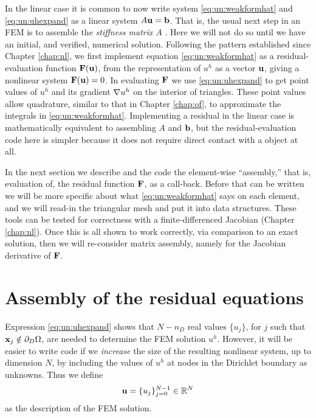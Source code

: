 In the linear case it is common to now write system \eqref{eq:un:weakformhat} and \eqref{eq:un:uhexpand} as a linear system $A \mathbf{u} = \mathbf{b}$.  That is, the usual next step in an FEM is to assemble the \emph{stiffness matrix} $A$ \citep{Elmanetal2005}.  Here we will not do so until we have an initial, and verified, numerical solution.  Following the pattern established since Chapter \ref{chap:nl}, we first implement equation \eqref{eq:un:weakformhat} as a residual-evaluation function $\mathbf{F}(\mathbf{u})$, from the representation of $u^h$ as a vector $\mathbf{u}$, giving a nonlinear system $\mathbf{F}(\mathbf{u}) = 0$.  In evaluating $\mathbf{F}$ we use \eqref{eq:un:uhexpand} to get point values of $u^h$ and its gradient $\nabla u^h$ on the interior of triangles.  These point values allow quadrature, similar to that in Chapter \ref{chap:of}, to approximate the integrals in \eqref{eq:un:weakformhat}.  Implementing a residual in the linear case is mathematically equivalent to assembling $A$ and $\mathbf{b}$, but the residual-evaluation code here is simpler because it does not require direct contact with a \pMat object at all.

In the next section we describe and the code the element-wise ``assembly,'' that is, evaluation of, the residual function $\mathbf{F}$, as a \pSNES call-back.  Before that can be written we will be more specific about what \eqref{eq:un:weakformhat} says on each element, and we will read-in the triangular mesh and put it into \PETSc data structures.  These tools can be tested for correctness with a finite-differenced Jacobian (Chapter \ref{chap:nl}).  Once this is all shown to work correctly, via comparison to an exact solution, then we will re-consider matrix assembly, namely for the Jacobian derivative of $\mathbf{F}$.


\section{Assembly of the residual equations}

Expression \eqref{eq:un:uhexpand} shows that $N-n_D$ real values $\{u_j\}$, for $j$ such that $\mathbf{x}_j \notin \partial_D \Omega$, are needed to determine the FEM solution $u^h$.  However, it will be easier to write code if we \emph{increase} the size of the resulting nonlinear system, up to dimension $N$, by including the values of $u^h$ at nodes in the Dirichlet boundary as unknowns.  Thus we define
\begin{equation}
\mathbf{u} = \{u_j\}_{j=0}^{N-1} \in \mathbb{R}^N  \label{eq:un:unknowns}
\end{equation}
as the description of the FEM solution.

